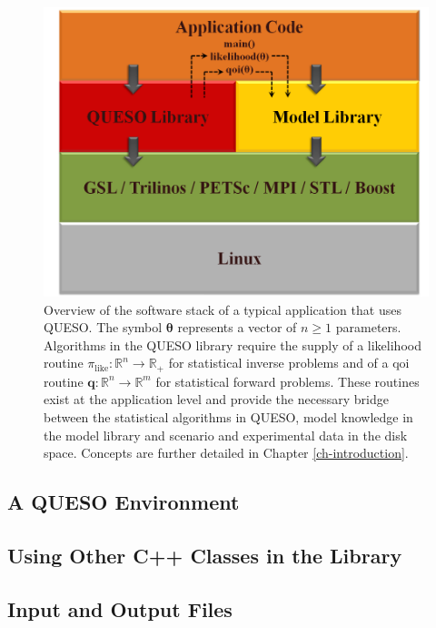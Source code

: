 \begin{figure}[h!]
\centerline{
\includegraphics[scale=0.50,clip=true]{figs/queso_paper1_03}
}
\caption{
Overview of the software stack of a typical application that uses QUESO.
The symbol $\boldsymbol{\theta}$ represents a vector of $n\geqslant 1$ parameters.
Algorithms in the QUESO library require the supply
of a likelihood routine $\pi_{\text{like}}:\mathbb{R}^n\rightarrow\mathbb{R}_+$ for statistical inverse problems and 
of a qoi routine $\mathbf{q}:\mathbb{R}^n\rightarrow\mathbb{R}^m$ for statistical forward problems. These routines
exist at the application level and provide the necessary bridge between the statistical algorithms in QUESO,
model knowledge in the model library and scenario and experimental data in the disk space.
Concepts are further detailed in Chapter \ref{ch-introduction}.
}
\label{fig-sw-stack}
\end{figure}

\subsection{A QUESO Environment}

\subsection{Using Other C++ Classes in the Library}

\subsection{Input and Output Files}

